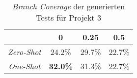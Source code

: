 \bgroup
\def\arraystretch{2}
\begin{table}[H]
	\vspace{.5cm}
	\centering		
	\begin{center}
		\begin{tabular}{|c||c|c|c|}
			\hline 
			& 0 & 0.25 & 0.5 \\
			\hline 
			\hline
			\textit{Zero-Shot} & 24.2\% & 29.7\% & 22.7\% \\
			\hline
			\textit{One-Shot} & \textbf{32.0\%} & 31.3\% & 22.7\% \\
			\hline
		\end{tabular} 
	\end{center}
	\caption{\textit{Branch Coverage} der generierten Tests für Projekt 3}
	\label{fig:branch-3}
	\vspace{-.8cm}
\end{table}
\egroup